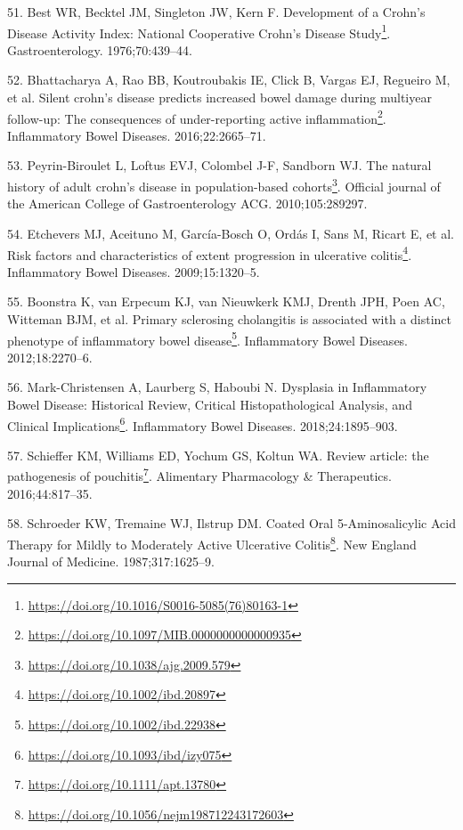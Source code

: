 \documentclass[
  12pt,
  a4paper,
  twoside,
  openright]{book}
\DeclareRobustCommand{\href}[2]{#2\footnote{\url{#1}}}
\newlength{\cslhangindent}
\newlength{\cslentryspacingunit} %
\newenvironment{CSLReferences}[2] %
 {%
  \setlength{\parindent}{0pt}
  \ifodd #1
  \let\oldpar\par
  \def\par{\hangindent=\cslhangindent\oldpar}
  \fi
  \setlength{\parskip}{#2\cslentryspacingunit}
 }%
 {}
\begin{document}
\begin{CSLReferences}{0}{0}
\leavevmode{}%
51. Best WR, Becktel JM, Singleton JW, Kern F. \href{https://doi.org/10.1016/S0016-5085(76)80163-1}{Development of a Crohn's Disease Activity Index: National Cooperative Crohn's Disease Study}. Gastroenterology. 1976;70:439--44.

\leavevmode{}%
52. Bhattacharya A, Rao BB, Koutroubakis IE, Click B, Vargas EJ, Regueiro M, et al. \href{https://doi.org/10.1097/MIB.0000000000000935}{Silent crohn's disease predicts increased bowel damage during multiyear follow-up: The consequences of under-reporting active inflammation}. Inflammatory Bowel Diseases. 2016;22:2665--71.

\leavevmode{}%
53. Peyrin-Biroulet L, Loftus EVJ, Colombel J-F, Sandborn WJ. \href{https://doi.org/10.1038/ajg.2009.579}{The natural history of adult crohn's disease in population-based cohorts}. Official journal of the American College of Gastroenterology \textbar{} ACG. 2010;105:289297.

\leavevmode{}%
54. Etchevers MJ, Aceituno M, García-Bosch O, Ordás I, Sans M, Ricart E, et al. \href{https://doi.org/10.1002/ibd.20897}{Risk factors and characteristics of extent progression in ulcerative colitis}. Inflammatory Bowel Diseases. 2009;15:1320--5.

\leavevmode{}%
55. Boonstra K, van Erpecum KJ, van Nieuwkerk KMJ, Drenth JPH, Poen AC, Witteman BJM, et al. \href{https://doi.org/10.1002/ibd.22938}{Primary sclerosing cholangitis is associated with a distinct phenotype of inflammatory bowel disease}. Inflammatory Bowel Diseases. 2012;18:2270--6.

\leavevmode{}%
56. Mark-Christensen A, Laurberg S, Haboubi N. \href{https://doi.org/10.1093/ibd/izy075}{Dysplasia in Inflammatory Bowel Disease: Historical Review, Critical Histopathological Analysis, and Clinical Implications}. Inflammatory Bowel Diseases. 2018;24:1895--903.

\leavevmode{}%
57. Schieffer KM, Williams ED, Yochum GS, Koltun WA. \href{https://doi.org/10.1111/apt.13780}{Review article: the pathogenesis of pouchitis}. Alimentary Pharmacology \& Therapeutics. 2016;44:817--35.

\leavevmode{}%
58. Schroeder KW, Tremaine WJ, Ilstrup DM. \href{https://doi.org/10.1056/nejm198712243172603}{Coated Oral 5-Aminosalicylic Acid Therapy for Mildly to Moderately Active Ulcerative Colitis}. New England Journal of Medicine. 1987;317:1625--9.


\end{CSLReferences}
\end{document}
